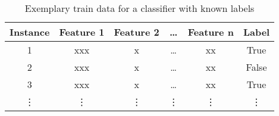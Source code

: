 \begin{table}[h!]
    \small
    \centering
    \begin{tabular}{@{}cccccc@{}}
        \toprule
        \textbf{Instance} & \textbf{Feature 1} & \textbf{Feature 2} & \dots  & \textbf{Feature n} & \textbf{Label} \\
        \midrule
        1                 & xxx                & x                  & \dots  & xx                 & True           \\
        2                 & xxx                & x                  & \dots  & xx                 & False          \\
        3                 & xxx                & x                  & \dots  & xx                 & True           \\
        \vdots            & \vdots             & \vdots             & \vdots & \vdots             & \vdots         \\
        \bottomrule
    \end{tabular}
    \caption[Exemplary train data for a classifier with known labels]{Exemplary train data for a classifier with known labels \footnotemark}
    \label{tab:classifier_label_data}
\end{table}
